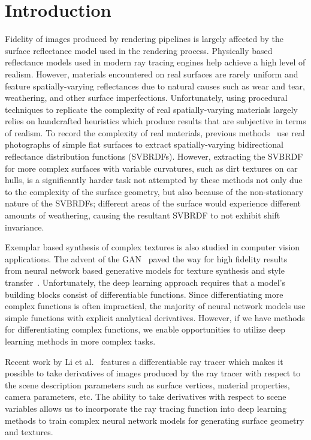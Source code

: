 \chapter{Introduction}

Fidelity of images produced by rendering pipelines is largely affected by the surface
reflectance model used in the rendering process. Physically based reflectance models used in
modern ray tracing engines help achieve a high level of realism. However, materials encountered
on real surfaces are rarely uniform and feature spatially-varying reflectances due to natural
causes such as wear and tear, weathering, and other surface imperfections. Unfortunately, using
procedural techniques to replicate the complexity of real spatially-varying materials largely
relies on handcrafted heuristics which produce results that are subjective in terms of realism.
To record the complexity of real materials, previous
methods~\cite{aittala2016reflectance, aittala2013practical, aittala2015two, deschaintre2018single}
use real photographs of simple flat surfaces to extract spatially-varying bidirectional
reflectance distribution functions (SVBRDFs). However, extracting the SVBRDF for more complex
surfaces with variable curvatures, such as dirt textures on car hulls, is a significantly harder
task not attempted by these methods not only due to the complexity of the surface geometry, but
also because of the non-stationary nature of the SVBRDFs; different areas of the surface would
experience different amounts of weathering, causing the resultant SVBRDF to not exhibit shift
invariance.

Exemplar based synthesis of complex textures is also studied in computer vision applications.
The advent of the GAN~\cite{goodfellow2014generative} paved the way for high fidelity results from
neural network based generative models for texture synthesis and style
transfer~\cite{zhu2017unpaired, isola2017image, zhou2018non}. Unfortunately, the deep learning
approach requires that a model's building blocks consist of differentiable functions. Since
differentiating more complex functions is often impractical, the majority of neural network models
use simple functions with explicit analytical derivatives. However, if we have methods for
differentiating complex functions, we enable opportunities to utilize deep learning methods in
more complex tasks.

Recent work by Li et al.~\cite{li2018differentiable} features a differentiable ray tracer which
makes it possible to take derivatives of images produced by the ray tracer with respect to the
scene description parameters such as surface vertices, material properties, camera parameters,
etc. The ability to take derivatives with respect to scene variables allows us to incorporate the
ray tracing function into deep learning methods to train complex neural network models for
generating surface geometry and textures.

